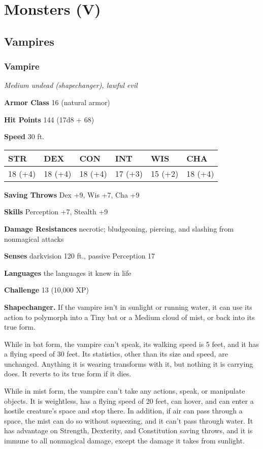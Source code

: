 \documentclass[
]{article}
\date{}
\begin{document}
\hypertarget{monsters-v}{%
\section{Monsters (V)}\label{monsters-v}}

\hypertarget{vampires}{%
\subsection{Vampires}\label{vampires}}

\hypertarget{vampire}{%
\subsubsection{Vampire}\label{vampire}}

\emph{Medium undead (shapechanger), lawful evil}

\textbf{Armor Class} 16 (natural armor)

\textbf{Hit Points} 144 (17d8 + 68)

\textbf{Speed} 30 ft.

\begin{longtable}[]{@{}llllll@{}}
\toprule
STR & DEX & CON & INT & WIS & CHA\tabularnewline
\midrule
\endhead
18 (+4) & 18 (+4) & 18 (+4) & 17 (+3) & 15 (+2) & 18 (+4)\tabularnewline
\bottomrule
\end{longtable}

\textbf{Saving Throws} Dex +9, Wis +7, Cha +9

\textbf{Skills} Perception +7, Stealth +9

\textbf{Damage Resistances} necrotic; bludgeoning, piercing, and
slashing from nonmagical attacks

\textbf{Senses} darkvision 120 ft., passive Perception 17

\textbf{Languages} the languages it knew in life

\textbf{Challenge} 13 (10,000 XP)

\textbf{Shapechanger.} If the vampire isn't in sunlight or running
water, it can use its action to polymorph into a Tiny bat or a Medium
cloud of mist, or back into its true form.

While in bat form, the vampire can't speak, its walking speed is 5 feet,
and it has a flying speed of 30 feet. Its statistics, other than its
size and speed, are unchanged. Anything it is wearing transforms with
it, but nothing it is carrying does. It reverts to its true form if it
dies.

While in mist form, the vampire can't take any actions, speak, or
manipulate objects. It is weightless, has a flying speed of 20 feet, can
hover, and can enter a hostile creature's space and stop there. In
addition, if air can pass through a space, the mist can do so without
squeezing, and it can't pass through water. It has advantage on
Strength, Dexterity, and Constitution saving throws, and it is immune to
all nonmagical damage, except the damage it takes from sunlight.
\end{document}
